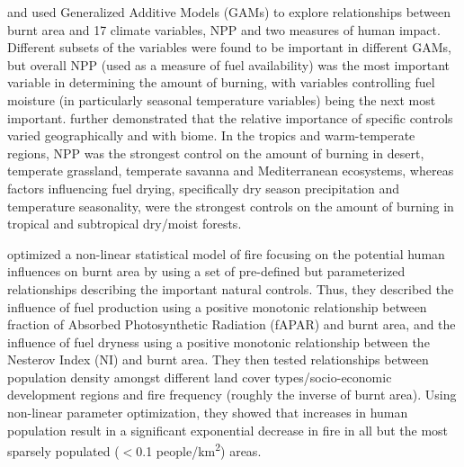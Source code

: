 \citet{krawchuk2009global} and \citet{moritz2012climate} used Generalized Additive Models (GAMs) to explore relationships between burnt area and 17 climate variables, NPP and two measures of human impact. Different subsets of the variables were found to be important in different GAMs, but overall NPP (used as a measure of fuel availability) was the most important variable in determining the amount of burning, with variables controlling fuel moisture (in particularly seasonal temperature variables) being the next most important. \citet{moritz2012climate} further demonstrated that the relative importance of specific controls varied geographically and with biome. In the tropics and warm-temperate regions, NPP was the strongest control on the amount of burning in desert, temperate grassland, temperate savanna and Mediterranean ecosystems, whereas factors influencing fuel drying, specifically dry season precipitation and temperature seasonality, were the strongest controls on the amount of burning in tropical and subtropical dry/moist forests.

\citet{knorr2014impact} optimized a non-linear statistical model of fire focusing on the potential human influences on burnt area by using a set of pre-defined but parameterized relationships describing the important natural controls. Thus, they described the influence of fuel production using a positive monotonic relationship between fraction of Absorbed Photosynthetic Radiation (fAPAR) and burnt area, and the influence of fuel dryness using a positive monotonic relationship between the Nesterov Index (NI) and burnt area. They then tested relationships between population density amongst different land cover types/socio-economic development regions and fire frequency (roughly the inverse of burnt area). Using non-linear parameter optimization, they showed that increases in human population result in a significant exponential decrease in fire in all but the most sparsely populated ($<$0.1 people/km\textsuperscript{2}) areas.

